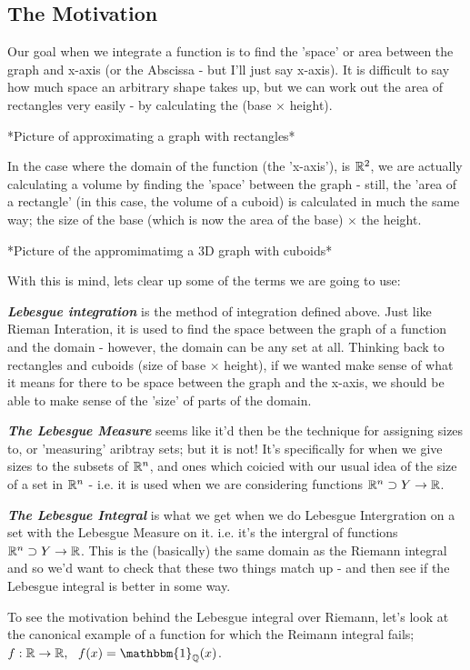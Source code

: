\subsection{The Motivation}

Our goal when we integrate a function is to find the 'space' or area between the graph and  x-axis (or the Abscissa - but I'll just say x-axis). It is difficult to say how much space an arbitrary shape takes up, but we can work out the area of rectangles very easily - by calculating the (base $\times$ height). 

*Picture of approximating a graph with rectangles*

In the case where the domain of the function (the 'x-axis'), is $\mathbb{R}^2$, we are actually calculating a volume by finding the 'space' between the graph - still, the 'area of a rectangle' (in this case, the volume of a cuboid) is calculated in much the same way; the size of the base (which is now the area of the base) $\times$ the height. 

*Picture of the appromimatimg a 3D graph with cuboids*

With this is mind, lets clear up some of the terms we are going to use:

{\bf \em Lebesgue integration\/} is the method of integration defined above. Just like Rieman Interation, it is used to find the space between the graph of a function and the domain - however, the domain can be any set at all. Thinking back to rectangles and cuboids (size of base $\times$ height), if we wanted make sense of what it means for there to be space between the graph and the x-axis, we should be able to make sense of the 'size' of parts of the domain.

{\bf \em The Lebesgue Measure\/} seems like it'd then be the technique for assigning sizes to, or 'measuring' aribtray sets; but it is not! It's specifically for when we give sizes to the subsets of $\mathbb{R}^n$, and ones which coicied with our usual idea of the size of a set in $\mathbb{R}^n$ - i.e. it is used when we are considering functions $\mathbb{R}^n \supset Y \rightarrow \mathbb{R}$. 

{\bf \em The Lebesgue Integral\/} is what we get when we do Lebesgue Intergration on a set with the Lebesgue Measure on it. i.e. it's the intergral of functions $\mathbb{R}^n \supset Y \rightarrow \mathbb{R}$. This is the (basically) the same domain as the Riemann integral and so we'd want to check that these two things match up - and then see if the Lebesgue integral is better in some way.

To see the motivation behind the Lebesgue integral over Riemann, let's look at the canonical example of a function for which the Reimann integral fails; $f:\R \rightarrow \R,\ \ f(x) = \mathbbm{1}_\Q(x)$.

